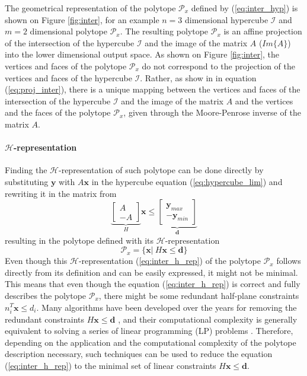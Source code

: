 The geometrical representation of the polytope $\mathcal{P}_x$ defined by (\ref{eq:inter_hyp}) is shown on Figure \ref{fig:inter}, for an example $n=3$ dimensional hypercube $\mathcal{I}$ and $m=2$ dimensional polytope $\mathcal{P}_x$. 
The resulting polytope $\mathcal{P}_x$ is an affine projection of the intersection of the hypercube $\mathcal{I}$ and the image of the matrix $A$ ($Im\{A\}$) into the lower dimensional output space. As shown on Figure \ref{fig:inter}, the vertices and faces of the polytope $\mathcal{P}_x$ do not correspond to the projection of the vertices and faces of the hypercube $\mathcal{I}$. Rather, as show in in equation (\ref{eq:proj_inter}), there is a unique mapping between the vertices and faces of the intersection of the hypercube $\mathcal{I}$ and the image of the matrix $A$ and the vertices and the faces of the polytope $\mathcal{P}_x$, given through the Moore-Penrose inverse of the matrix $A$. 

\paragraph*{$\mathcal{H}$-representation} Finding the $\mathcal{H}$-representation of such polytope can be done directly by substituting $\bm{y}$ with $A\bm{x}$ in the hypercube equation (\ref{eq:hypercube_lim}) and rewriting it in the matrix from
\begin{equation}
   \underbrace{\begin{bmatrix}
        A\\
        -A
    \end{bmatrix}}_{H}\bm{x} \leq \underbrace{\begin{bmatrix}
         \bm{y}_{max}\\
        -\bm{y}_{min} 
    \end{bmatrix} }_{\bm{d}}
\end{equation}
resulting in the polytope defined with its $\mathcal{H}$-representation
\begin{equation}
    \mathcal{P}_x=\{\bm{x} |~ H\bm{x} \leq \bm{d} \}
    \label{eq:inter_h_rep}
\end{equation}
Even though this $\mathcal{H}$-representation (\ref{eq:inter_h_rep}) of the polytope $\mathcal{P}_x$ follows directly from its definition and can be easily expressed, it might not be minimal. This means that even though the equation (\ref{eq:inter_h_rep}) is correct and fully describes the polytope $\mathcal{P}_x$, there might be some redundant half-plane constraints $n_i^T\bm{x}\leq d_i$. Many algorithms have been developed over the years for removing the redundant constraints $H\bm{x}\leq\bm{d}$ \cite{Paulraj2006}, and their computational complexity is generally equivalent to solving a series of linear programming (LP) problems \cite{Telgen1983}. Therefore, depending on the application and the computational complexity of the polytope description necessary, such techniques can be used to reduce the equation (\ref{eq:inter_h_rep}) to the minimal set of linear constraints $H\bm{x}\leq \bm{d}$.
 
